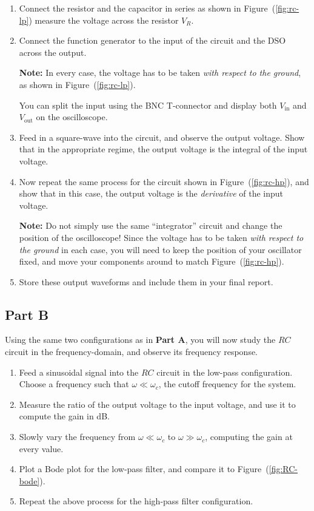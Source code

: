 \begin{enumerate}
    \item Connect the resistor and the capacitor in series as shown in Figure~(\ref{fig:rc-lp}) measure the voltage across the resistor $V_R$.
    \item Connect the function generator to the input of the circuit and the DSO across the output.
    \begin{imp}
        \textbf{Note:} In every case, the voltage has to be taken \textsl{with respect to the ground}, as shown in Figure~(\ref{fig:rc-lp}). 
    \end{imp}

    You can split the input using the BNC T-connector and display both $V_\text{in}$ and $V_\text{out}$ on the oscilloscope.
    \item Feed in a square-wave into the circuit, and observe the output voltage. Show that in the appropriate regime, the output voltage is the integral of the input voltage.

    \item Now repeat the same process for the circuit shown in Figure~(\ref{fig:rc-hp}), and show that in this case, the output voltage is the \textsl{derivative} of the input voltage.
    \begin{imp}
        \textbf{Note:} Do not simply use the same ``integrator'' circuit and change the position of the oscilloscope! Since the voltage has to be taken \textsl{with respect to the ground} in each case, you will need to keep the position of your oscillator fixed, and move your components around to match Figure~(\ref{fig:rc-hp}).
    \end{imp}

    \item Store these output waveforms and include them in your final report.
\end{enumerate}


\subsection*{Part B}

Using the same two configurations as in \textbf{Part A}, you will now study the $RC$ circuit in the frequency-domain, and observe its frequency response.

\begin{enumerate}
    \item Feed a sinusoidal signal into the $RC$ circuit in the low-pass configuration. Choose a frequency such that $\omega \ll \omega_c$, the cutoff frequency for the system.
    \item Measure the ratio of the output voltage to the input voltage, and use it to compute the gain in dB.
    \item Slowly vary the frequency from $\omega \ll \omega_c$ to $\omega \gg \omega_c$, computing the gain at every value.
    \item Plot a Bode plot for the low-pass filter, and compare it to Figure~(\ref{fig:RC-bode}).
    \item Repeat the above process for the high-pass filter configuration.
\end{enumerate}

